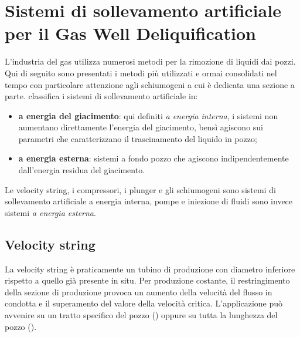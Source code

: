 \section[Artificial lift per GDW]{Sistemi di sollevamento artificiale per il Gas Well Deliquification}
L'industria del gas utilizza numerosi metodi per la rimozione di liquidi dai pozzi. Qui di seguito sono presentati i metodi più utilizzati e ormai consolidati nel tempo con particolare attenzione agli schiumogeni a cui è dedicata una sezione a parte. \textcite{oyewole2008artificial} classifica i sistemi di sollevamento artificiale in:
\begin{itemize}
    \item \textbf{a energia del giacimento}: qui definiti  \textit{a energia interna}, i sistemi non aumentano direttamente l'energia del giacimento, bensì agiscono sui parametri che caratterizzano il trascinamento del liquido in pozzo;
    \item \textbf{a energia esterna}: sistemi a fondo pozzo che agiscono indipendentemente dall'energia residua del giacimento.
\end{itemize}
Le velocity string, i compressori, i plunger e gli schiumogeni sono sistemi di sollevamento artificiale a energia interna, pompe e iniezione di fluidi sono invece sistemi \textit{a energia esterna}.

\subsection{Velocity string}
La velocity string è praticamente un tubino di produzione con diametro inferiore rispetto a quello già presente in situ. Per produzione costante, il restringimento della sezione di produzione provoca un aumento della velocità del flusso in condotta e il superamento del valore della velocità critica. L'applicazione può avvenire su un tratto specifico del pozzo () oppure su tutta la lunghezza del pozzo ().

